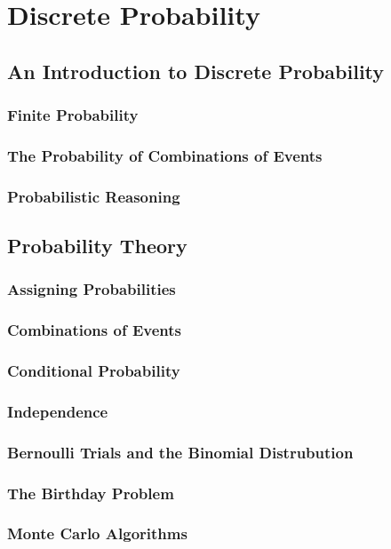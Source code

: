 



\chapter {Discrete Probability}
\section {An Introduction to Discrete Probability}
    \subsection {Finite Probability}
    \subsection {The Probability of Combinations of Events}
    \subsection {Probabilistic Reasoning}

\section {Probability Theory}
    \subsection {Assigning Probabilities}
    \subsection {Combinations of Events}
    \subsection {Conditional Probability}
    \subsection {Independence}
    \subsection {Bernoulli Trials and the Binomial Distrubution}
    \subsection {The Birthday Problem}
    \subsection {Monte Carlo Algorithms}
